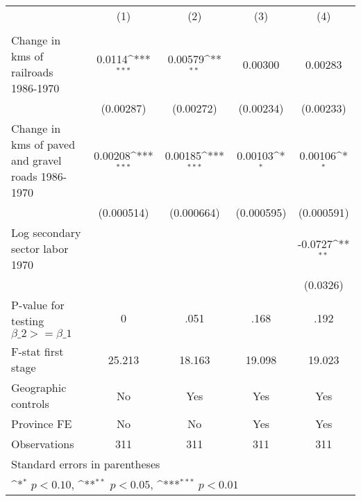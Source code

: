 {
\def\sym#1{\ifmmode^{#1}\else\(^{#1}\)\fi}
\begin{tabular}{l*{4}{c}}
\hline\hline
                &\multicolumn{1}{c}{(1)}&\multicolumn{1}{c}{(2)}&\multicolumn{1}{c}{(3)}&\multicolumn{1}{c}{(4)}\\
                &\multicolumn{1}{c}{}&\multicolumn{1}{c}{}&\multicolumn{1}{c}{}&\multicolumn{1}{c}{}\\
\hline
Change in kms of railroads 1986-1970&   0.0114\sym{***}&  0.00579\sym{**} &  0.00300         &  0.00283         \\
                &(0.00287)         &(0.00272)         &(0.00234)         &(0.00233)         \\
[1em]
Change in kms of paved and gravel roads 1986-1970&  0.00208\sym{***}&  0.00185\sym{***}&  0.00103\sym{*}  &  0.00106\sym{*}  \\
                &(0.000514)         &(0.000664)         &(0.000595)         &(0.000591)         \\
[1em]
Log secondary sector labor 1970&                  &                  &                  &  -0.0727\sym{**} \\
                &                  &                  &                  & (0.0326)         \\
\hline
P-value for testing $\beta\_{2} >= \beta\_{1}$&        0         &     .051         &     .168         &     .192         \\
F-stat first stage&   25.213         &   18.163         &   19.098         &   19.023         \\
Geographic controls&       No         &      Yes         &      Yes         &      Yes         \\
Province FE     &       No         &       No         &      Yes         &      Yes         \\
Observations    &      311         &      311         &      311         &      311         \\
\hline\hline
\multicolumn{5}{l}{\footnotesize Standard errors in parentheses}\\
\multicolumn{5}{l}{\footnotesize \sym{*} \(p<0.10\), \sym{**} \(p<0.05\), \sym{***} \(p<0.01\)}\\
\end{tabular}
}
